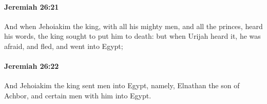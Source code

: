 		\paragraph{Jeremiah 26:21} %
			\label{JEREMIAH-26-21}

			And when Jehoiakim the king, with all his mighty men, and all the princes, heard his words, the king sought to put him to death: but when Urijah heard it, he was afraid, and fled, and went into Egypt;


		\paragraph{Jeremiah 26:22} %
			\label{JEREMIAH-26-22}

			And Jehoiakim the king sent men into Egypt, namely, Elnathan the son of Achbor, and certain men with him into Egypt.


